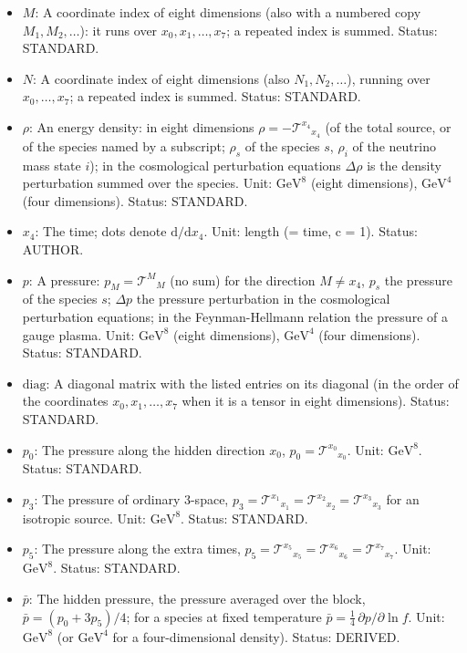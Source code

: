 \documentclass[
  10pt,
]{article}
\begin{document}
\begin{itemize}
  metric. Unit: \(\mathrm{GeV}^{8}\). Status: STANDARD.
\item
  \(M\): A coordinate index of eight dimensions (also with a numbered
  copy \(M_1, M_2, \dots\)): it runs over \(x_0, x_1, \dots, x_7\); a
  repeated index is summed. Status: STANDARD.
\item
  \(N\): A coordinate index of eight dimensions (also
  \(N_1, N_2, \dots\)), running over \(x_0, \dots, x_7\); a repeated
  index is summed. Status: STANDARD.
\item
  \(\rho\): An energy density: in eight dimensions
  \(\rho = -\mathcal{T}^{x_4}{}_{x_4}\) (of the total source, or of the
  species named by a subscript; \(\rho_s\) of the species \(s\),
  \(\rho_i\) of the neutrino mass state \(i\)); in the cosmological
  perturbation equations \(\Delta\rho\) is the density perturbation
  summed over the species. Unit: \(\mathrm{GeV}^{8}\) (eight
  dimensions), \(\mathrm{GeV}^{4}\) (four dimensions). Status: STANDARD.
\item
  \(x_4\): The time; dots denote \(\mathrm{d}/\mathrm{d}x_4\). Unit:
  length (= time, c = 1). Status: AUTHOR.
\item
  \(p\): A pressure: \(p_M = \mathcal{T}^M{}_M\) (no sum) for the
  direction \(M \ne x_4\), \(p_s\) the pressure of the species \(s\);
  \(\Delta p\) the pressure perturbation in the cosmological
  perturbation equations; in the Feynman-Hellmann relation the pressure
  of a gauge plasma. Unit: \(\mathrm{GeV}^{8}\) (eight dimensions),
  \(\mathrm{GeV}^{4}\) (four dimensions). Status: STANDARD.
\item
  \(\mathrm{diag}\): A diagonal matrix with the listed entries on its
  diagonal (in the order of the coordinates \(x_0, x_1, \dots, x_7\)
  when it is a tensor in eight dimensions). Status: STANDARD.
\item
  \(p_0\): The pressure along the hidden direction \(x_0\),
  \(p_0 = \mathcal{T}^{x_0}{}_{x_0}\). Unit: \(\mathrm{GeV}^{8}\).
  Status: STANDARD.
\item
  \(p_3\): The pressure of ordinary 3-space,
  \(p_3 = \mathcal{T}^{x_1}{}_{x_1} = \mathcal{T}^{x_2}{}_{x_2} = \mathcal{T}^{x_3}{}_{x_3}\)
  for an isotropic source. Unit: \(\mathrm{GeV}^{8}\). Status: STANDARD.
\item
  \(p_5\): The pressure along the extra times,
  \(p_5 = \mathcal{T}^{x_5}{}_{x_5} = \mathcal{T}^{x_6}{}_{x_6} = \mathcal{T}^{x_7}{}_{x_7}\).
  Unit: \(\mathrm{GeV}^{8}\). Status: STANDARD.
\item
  \(\bar p\): The hidden pressure, the pressure averaged over the block,
  \(\bar p = (p_0 + 3p_5)/4\); for a species at fixed temperature
  \(\bar p = \frac14\,\partial p/\partial\ln f\). Unit:
  \(\mathrm{GeV}^{8}\) (or \(\mathrm{GeV}^{4}\) for a four-dimensional
  density). Status: DERIVED.
\end{itemize}
\end{document}
